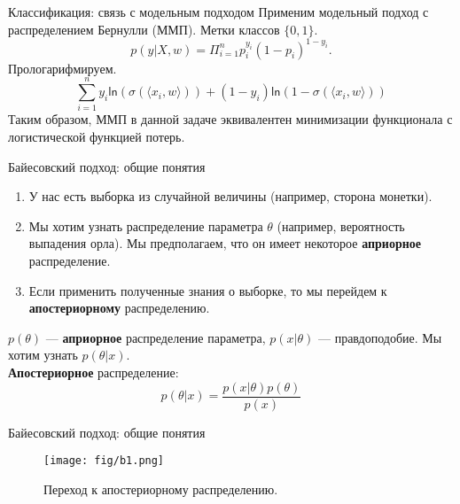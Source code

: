 \documentclass[handout]{beamer}
\begin{document}
\begin{frame}{Классификация: связь с модельным подходом}
	Применим модельный подход с распределением Бернулли (ММП). Метки классов $\{0, 1\}$.
	\begin{equation}
		p(y|X, w)=\Pi_{i=1}^np_i^{y_i}(1-p_i)^{1-y_i}.
	\end{equation} 
	Прологарифмируем.
	\begin{equation}
		 \sum_{i=1}^ny_i\mathsf{ln}(\sigma(\langle x_i, w\rangle)) + (1-y_i)\mathsf{ln}(1-\sigma(\langle x_i, w\rangle))
	\end{equation}
	Таким образом, ММП в данной задаче эквивалентен минимизации  функционала с логистической функцией потерь.
\end{frame}

\begin{frame}{Байесовский подход: общие понятия}
	\begin{enumerate}
		\item У нас есть выборка из случайной величины (например, сторона монетки).
		\item Мы хотим узнать распределение параметра $\theta$ (например, вероятность выпадения орла). Мы предполагаем, что он имеет некоторое \textbf{априорное} распределение. 
		\item Если применить полученные знания о выборке, то мы перейдем к \textbf{апостериорному} распределению.
	\end{enumerate}
	$p(\theta)$ --- \textbf{априорное} распределение параметра, $p(x|\theta)$ --- правдоподобие. Мы хотим узнать $p(\theta|x)$.\\
	\textbf{Апостериорное} распределение:
	\begin{equation}
		p(\theta|x) = \frac{p(x|\theta)p(\theta)}{p(x)}
	\end{equation}
\end{frame}

\begin{frame}{Байесовский подход: общие понятия}
	\begin{figure}
	    \texttt{[image: fig/b1.png]}
	    \caption{\small Переход к апостериорному распределению.
	    } 
	    \label{fig:w_series}
	\end{figure}
\end{frame}
\end{document}
